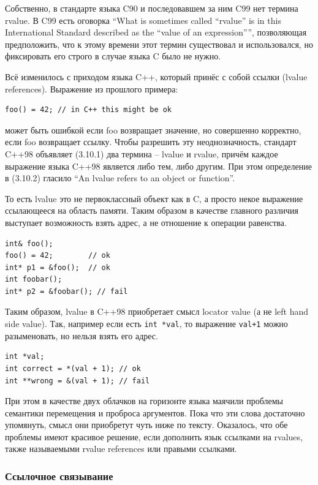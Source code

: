 \documentclass[a4paper,12pt,oneside]{article}
\begin{document}
Собственно, в стандарте языка C90 и последовавшем за ним C99 нет термина rvalue. В C99 есть оговорка ``What is sometimes called ``rvalue'' is in this International Standard described as the ``value of an expression'''', позволяющая предположить, что к этому времени этот термин существовал и использовался, но фиксировать его строго в случае языка C было не нужно.

Всё изменилось с приходом языка C++, который принёс с собой ссылки (lvalue references). Выражение из прошлого примера:

\begin{lstlisting}
foo() = 42; // in C++ this might be ok
\end{lstlisting}

может быть ошибкой если foo возвращает значение, но совершенно корректно, если foo возвращает ссылку. Чтобы разрешить эту неоднозначность, стандарт C++98 объявляет (3.10.1) два термина -- lvalue и rvalue, причём каждое выражение языка C++98 является либо тем, либо другим. При этом определение в (3.10.2) гласило ``An lvalue refers to an object or function''.

То есть lvalue это не первоклассный объект как в C, а просто некое выражение ссылающееся на область памяти. Таким образом в качестве главного различия выступает возможность взять адрес, а не отношение к операции равенства.

\begin{lstlisting}
int& foo();
foo() = 42;        // ok
int* p1 = &foo();  // ok
int foobar();
int* p2 = &foobar(); // fail
\end{lstlisting}

Таким образом, lvalue в C++98 приобретает смысл locator value (а не left hand side value). Так, например если есть \lstinline!int *val!, то выражение \lstinline!val+1! можно разыменовать, но нельзя взять его адрес.

\begin{lstlisting}
int *val;
int correct = *(val + 1); // ok
int **wrong = &(val + 1); // fail
\end{lstlisting}

При этом в качестве двух облачков на горизонте языка маячили проблемы семантики перемещения и проброса аргументов. Пока что эти слова достаточно упомянуть, смысл они приобретут чуть ниже по тексту. Оказалось, что обе проблемы имеют красивое решение, если дополнить язык ссылками на rvalues, также называемыми rvalue references или правыми ссылками.

\subsubsection{Ссылочное связывание}\label{subsub:refbinding}
\end{document}
